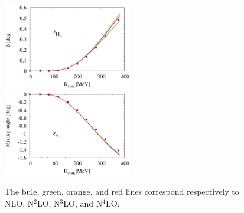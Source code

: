 \documentclass{article}
\begin{document}
\begin{figure}[htbp]
\includegraphics[width=0.5\textwidth]{6_3h4.eps}
\includegraphics[width=0.5\textwidth]{6_e4.eps}
\caption{The bule, green, orange, and red lines correspond respectively to NLO, N$^2$LO, N$^3$LO, and N$^4$LO. }
\end{figure}
\end{document}
